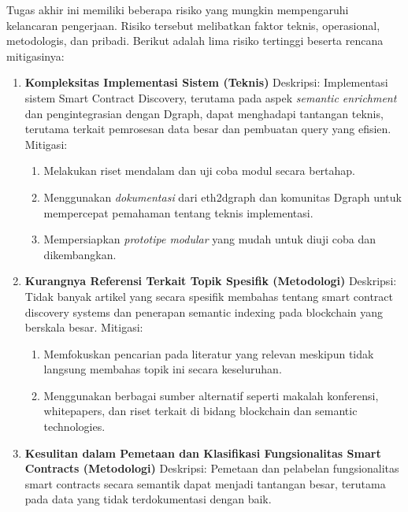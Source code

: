 Tugas akhir ini memiliki beberapa risiko yang mungkin mempengaruhi kelancaran pengerjaan. Risiko tersebut melibatkan faktor teknis, operasional, metodologis, dan pribadi. Berikut adalah lima risiko tertinggi beserta rencana mitigasinya:

\begin{enumerate}
	\item \textbf{Kompleksitas Implementasi Sistem (Teknis)} \newline
	      Deskripsi: Implementasi sistem Smart Contract Discovery, terutama pada aspek \textit{semantic enrichment} dan pengintegrasian dengan Dgraph, dapat menghadapi tantangan teknis, terutama terkait pemrosesan data besar dan pembuatan query yang efisien. \newline
	      Mitigasi:
	      \begin{enumerate}
		      \item Melakukan riset mendalam dan uji coba modul secara bertahap.
		      \item Menggunakan \textit{dokumentasi} dari eth2dgraph dan komunitas Dgraph untuk mempercepat pemahaman tentang teknis implementasi.
		      \item Mempersiapkan \textit{prototipe modular} yang mudah untuk diuji coba dan dikembangkan.
	      \end{enumerate}
	\item \textbf{Kurangnya Referensi Terkait Topik Spesifik (Metodologi)} \newline
	      Deskripsi: Tidak banyak artikel yang secara spesifik membahas tentang smart contract discovery systems dan penerapan semantic indexing pada blockchain yang berskala besar.  \newline
	      Mitigasi:
	      \begin{enumerate}
		      \item Memfokuskan pencarian pada literatur yang relevan meskipun tidak langsung membahas topik ini secara keseluruhan.
		      \item Menggunakan berbagai sumber alternatif seperti makalah konferensi, whitepapers, dan riset terkait di bidang blockchain dan semantic technologies.
	      \end{enumerate}
	\item \textbf{Kesulitan dalam Pemetaan dan Klasifikasi Fungsionalitas Smart Contracts (Metodologi)}  \newline
	      Deskripsi: Pemetaan dan pelabelan fungsionalitas smart contracts secara semantik dapat menjadi tantangan besar, terutama pada data yang tidak terdokumentasi dengan baik. \newline

\end{enumerate}
